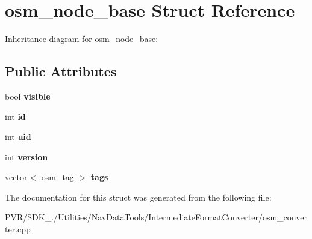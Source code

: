 \hypertarget{structosm__node__base}{\section{osm\+\_\+node\+\_\+base Struct Reference}
\label{structosm__node__base}
}


Inheritance diagram for osm\+\_\+node\+\_\+base\+:
\subsection*{Public Attributes}
\begin{DoxyCompactItemize}
\item 
\hypertarget{structosm__node__base_a60458158e3f95811f8ffed35acecfd61}{bool {\bfseries visible}}\label{structosm__node__base_a60458158e3f95811f8ffed35acecfd61}

\item 
\hypertarget{structosm__node__base_a80eab28ea9a9a8979c09734c3c97e2b1}{int {\bfseries id}}\label{structosm__node__base_a80eab28ea9a9a8979c09734c3c97e2b1}

\item 
\hypertarget{structosm__node__base_a44b6097b4784687d8c65a679759a9537}{int {\bfseries uid}}\label{structosm__node__base_a44b6097b4784687d8c65a679759a9537}

\item 
\hypertarget{structosm__node__base_a3b68aeb2c2703632eaefd3c5246bad45}{int {\bfseries version}}\label{structosm__node__base_a3b68aeb2c2703632eaefd3c5246bad45}

\item 
\hypertarget{structosm__node__base_ac5a2120e1f869100b7f3112444bbbf14}{vector$<$ \hyperlink{structosm__tag}{osm\+\_\+tag} $>$ {\bfseries tags}}\label{structosm__node__base_ac5a2120e1f869100b7f3112444bbbf14}

\end{DoxyCompactItemize}


The documentation for this struct was generated from the following file\+:\begin{DoxyCompactItemize}
\item 
P\+V\+R/\+S\+D\+K\+\_./\+Utilities/\+Nav\+Data\+Tools/\+Intermediate\+Format\+Converter/osm\+\_\+converter.\+cpp\end{DoxyCompactItemize}

